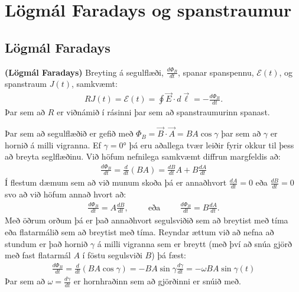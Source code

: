 \chapter{Lögmál Faradays og spanstraumur}

\section{Lögmál Faradays}

\begin{tcolorbox}
\begin{theorem}
\textbf{(Lögmál Faradays)} Breyting á segulflæði, $\frac{d\Phi_B}{dt}$, spanar spanspennu, $\mathcal{E}(t)$, og spanstraum $J(t)$, samkvæmt:
\begin{align*}
    R J(t) = \mathcal{E}(t) = \oint \Vec{E} \cdot d\vec{\ell} = -\frac{d\Phi_B}{dt}.
\end{align*}
Þar sem að $R$ er viðnámið í rásinni þar sem að spanstraumurinn spanast.
\end{theorem}
\end{tcolorbox}


Þar sem að segulflæðið er gefið með $\Phi_B = \vec{B} \cdot \vec{A} = BA\cos\gamma$ þar sem að $\gamma$ er hornið á milli vigranna. Ef $\gamma = \ang{0}$ þá eru aðallega tvær leiðir fyrir okkur til þess að breyta seglflæðinu. Við höfum nefnilega samkvæmt diffrun margfeldis að:
\begin{align*}
    \frac{d\Phi_B}{dt} = \frac{d}{dt}\left( BA \right) = \frac{dB}{dt} A + B \frac{dA}{dt}
\end{align*}
Í flestum dæmum sem að við munum skoða þá er annaðhvort $\frac{dA}{dt} = 0$ eða $\frac{dB}{dt} = 0$ svo að við höfum annað hvort að:
\begin{align*}
    \frac{d\Phi_B}{dt} = A \frac{dB}{dt}, \hspace{1cm} \text{eða} \hspace{1cm} \frac{d\Phi_B}{dt} = B \frac{dA}{dt}.
\end{align*}
Með öðrum orðum þá er það annaðhvort segulsviðið sem að breytist með tíma eða flatarmálið sem að breytist með tíma. Reyndar ættum við að nefna að stundum er það hornið $\gamma$ á milli vigranna sem er breytt (með því að snúa gjörð með fast flatarmál $A$ í föstu segulsviði $B$) þá fæst:
\begin{align*}
    \frac{d\Phi_B}{dt} = \frac{d}{dt}\left( BA \cos\gamma \right) = -BA\sin\gamma \frac{d\gamma}{dt} = -\omega BA \sin\gamma(t)
\end{align*}
Þar sem að $\omega = \frac{d\gamma}{dt}$ er hornhraðinn sem að gjörðinni er snúið með.

